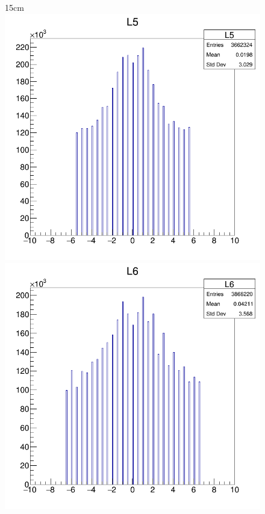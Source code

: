 \begin{figure}[htbp]{15cm}
	\includegraphics[scale=0.19]{AppendixCMSL1TT/figs/JetPt250_PU200_deltaS_l5}
	\includegraphics[scale=0.19]{AppendixCMSL1TT/figs/JetPt250_PU200_deltaS_l6}				
	\label{fig:deltaS_jet250_pu200}
\end{figure}

